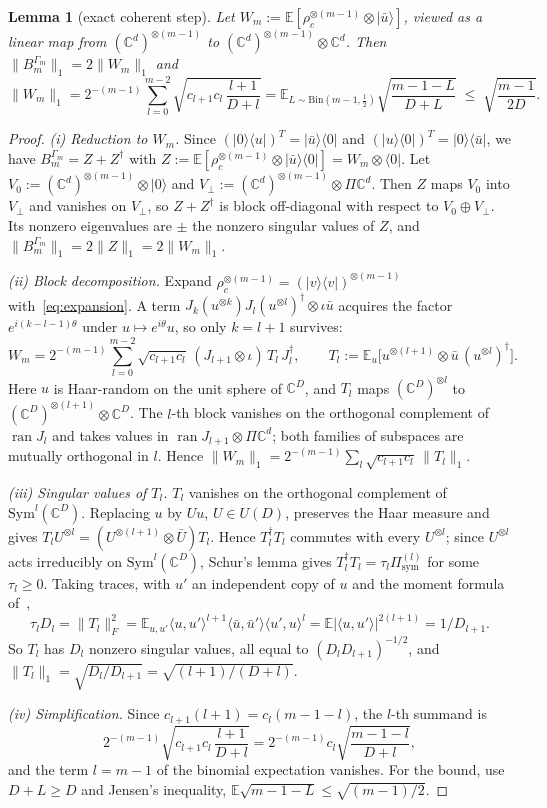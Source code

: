 \documentclass[pdflatex,sn-mathphys-num]{sn-jnl}%
\theoremstyle{thmstyleone}
\newtheorem{lemma}[theorem]{Lemma}
\theoremstyle{thmstylethree}
\theoremstyle{thmstyletwo}
\newcommand{\ran}{\operatorname{ran}}
\newcommand{\E}{\mathbb{E}}
\newcommand{\ket}[1]{|#1\rangle}
\newcommand{\bra}[1]{\langle #1|}
\newcommand{\sym}{\mathrm{sym}}
\newcommand{\C}{\mathbb{C}}
\begin{document}
\begin{lemma}[exact coherent step]\label{lem:coh}
Let $W_m:=\E[\rho_c^{\otimes(m-1)}\otimes\ket{\bar u}]$, viewed as a linear map from $(\C^d)^{\otimes(m-1)}$ to
$(\C^d)^{\otimes(m-1)}\otimes\C^d$. Then $\|B_m^{\Gamma_m}\|_1=2\|W_m\|_1$ and
\[
\|W_m\|_1=2^{-(m-1)}\sum_{l=0}^{m-2}\sqrt{c_{l+1}c_l\,\frac{l+1}{D+l}}
=\E_{L\sim\mathrm{Bin}(m-1,\frac12)}\sqrt{\frac{m-1-L}{D+L}}\;\le\;\sqrt{\frac{m-1}{2D}}.
\]
\end{lemma}
\begin{proof}
\emph{(i) Reduction to $W_m$.} Since $(\ket0\bra u)^T=\ket{\bar u}\bra0$ and $(\ket u\bra0)^T=\ket0\bra{\bar u}$, we have
$B_m^{\Gamma_m}=Z+Z^\dagger$ with $Z:=\E[\rho_c^{\otimes(m-1)}\otimes\ket{\bar u}\bra0]=W_m\otimes\bra0$. Let
$V_0:=(\C^d)^{\otimes(m-1)}\otimes\ket0$ and $V_\perp:=(\C^d)^{\otimes(m-1)}\otimes\Pi\C^d$. Then $Z$ maps $V_0$ into
$V_\perp$ and vanishes on $V_\perp$, so $Z+Z^\dagger$ is block off-diagonal with respect to $V_0\oplus V_\perp$. Its
nonzero eigenvalues are $\pm$ the nonzero singular values of $Z$, and $\|B_m^{\Gamma_m}\|_1=2\|Z\|_1=2\|W_m\|_1$.

\emph{(ii) Block decomposition.} Expand $\rho_c^{\otimes(m-1)}=(\ket v\bra v)^{\otimes(m-1)}$ with~\eqref{eq:expansion}.
A term $J_k(u^{\otimes k})J_l(u^{\otimes l})^\dagger\otimes\iota\bar u$ acquires the factor $e^{i(k-l-1)\theta}$ under
$u\mapsto e^{i\theta}u$, so only $k=l+1$ survives:
\[
W_m=2^{-(m-1)}\sum_{l=0}^{m-2}\sqrt{c_{l+1}c_l}\,(J_{l+1}\otimes\iota)\,T_l\,J_l^\dagger,\qquad
T_l:=\E_u\bigl[u^{\otimes(l+1)}\otimes\bar u\,(u^{\otimes l})^\dagger\bigr].
\]
Here $u$ is Haar-random on the unit sphere of $\C^D$, and $T_l$ maps $(\C^D)^{\otimes l}$ to
$(\C^D)^{\otimes(l+1)}\otimes\C^D$. The $l$-th block vanishes on the orthogonal complement of $\ran J_l$ and takes values
in $\ran J_{l+1}\otimes\Pi\C^d$; both families of subspaces are mutually orthogonal in $l$. Hence
$\|W_m\|_1=2^{-(m-1)}\sum_l\sqrt{c_{l+1}c_l}\,\|T_l\|_1$.

\emph{(iii) Singular values of $T_l$.} $T_l$ vanishes on the orthogonal complement of $\mathrm{Sym}^l(\C^D)$. Replacing
$u$ by $Uu$, $U\in U(D)$, preserves the Haar measure and gives $T_lU^{\otimes l}=(U^{\otimes(l+1)}\otimes\bar U)T_l$.
Hence $T_l^\dagger T_l$ commutes with every $U^{\otimes l}$; since $U^{\otimes l}$ acts irreducibly on
$\mathrm{Sym}^l(\C^D)$, Schur's lemma gives $T_l^\dagger T_l=\tau_l\Pi^{(l)}_\sym$ for some $\tau_l\ge0$. Taking traces,
with $u'$ an independent copy of $u$ and the moment formula of~\cite{harrow13},
\[
\tau_lD_l=\|T_l\|_F^2=\E_{u,u'}\langle u,u'\rangle^{l+1}\langle\bar u,\bar u'\rangle\langle u',u\rangle^{l}
=\E|\langle u,u'\rangle|^{2(l+1)}=1/D_{l+1}.
\]
So $T_l$ has $D_l$ nonzero singular values, all equal to $(D_lD_{l+1})^{-1/2}$, and
$\|T_l\|_1=\sqrt{D_l/D_{l+1}}=\sqrt{(l+1)/(D+l)}$.

\emph{(iv) Simplification.} Since $c_{l+1}(l+1)=c_l(m-1-l)$, the $l$-th summand is
\[
2^{-(m-1)}\sqrt{c_{l+1}c_l\,\frac{l+1}{D+l}}=2^{-(m-1)}c_l\sqrt{\frac{m-1-l}{D+l}},
\]
and the term $l=m-1$ of the binomial expectation vanishes. For the bound, use $D+L\ge D$ and Jensen's inequality,
$\E\sqrt{m-1-L}\le\sqrt{(m-1)/2}$.
\end{proof}
\end{document}
